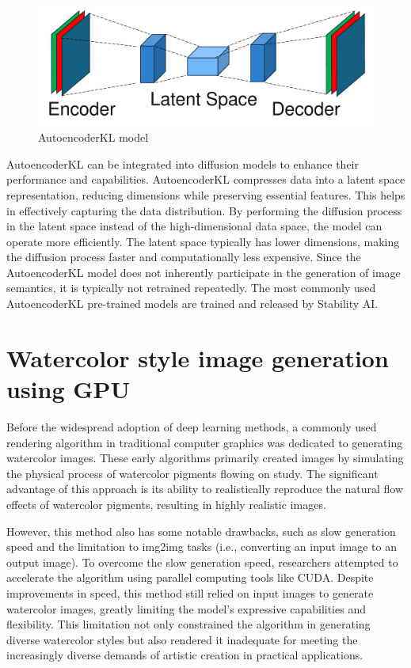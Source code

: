 \documentclass[12pt]{report}
\begin{document}
\begin{figure}[h]
    \centering
    \includegraphics[width=12cm]{image/AutoencoderKL.pdf}
    \caption{AutoencoderKL model}
    \label{fig:AutoencoderKL}
\end{figure}

AutoencoderKL can be integrated into diffusion models to enhance their performance and capabilities. AutoencoderKL compresses data into a latent space representation, reducing dimensions while preserving essential features. This helps in effectively capturing the data distribution. By performing the diffusion process in the latent space instead of the high-dimensional data space, the model can operate more efficiently. The latent space typically has lower dimensions, making the diffusion process faster and computationally less expensive.
Since the AutoencoderKL model does not inherently participate in the generation of image semantics, it is typically not retrained repeatedly. The most commonly used AutoencoderKL pre-trained models are trained and released by Stability AI.
\section{Watercolor style image generation using GPU}
Before the widespread adoption of deep learning methods, a commonly used rendering algorithm in traditional computer graphics was dedicated to generating watercolor images. These early algorithms primarily created images by simulating the physical process of watercolor pigments flowing on study. The significant advantage of this approach is its ability to realistically reproduce the natural flow effects of watercolor pigments, resulting in highly realistic images.

However, this method also has some notable drawbacks, such as slow generation speed and the limitation to img2img tasks (i.e., converting an input image to an output image). To overcome the slow generation speed, researchers attempted to accelerate the algorithm using parallel computing tools like CUDA. Despite improvements in speed, this method still relied on input images to generate watercolor images, greatly limiting the model's expressive capabilities and flexibility. This limitation not only constrained the algorithm in generating diverse watercolor styles but also rendered it inadequate for meeting the increasingly diverse demands of artistic creation in practical applications.
\end{document}
